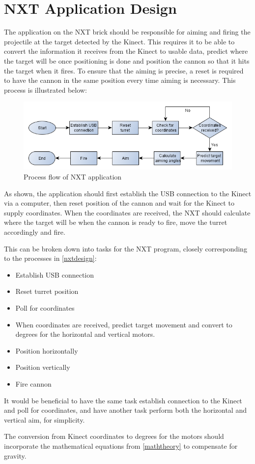 \section{NXT Application Design}

\label{nxtdesign}

The application on the NXT brick should be responsible for aiming and firing the projectile at the target detected by the Kinect. This requires it to be able to convert the information it receives from the Kinect to usable data, predict where the target will be once positioning is done and position the cannon so that it hits the target when it fires. To ensure that the aiming is precise, a reset is required to have the cannon in the same position every time aiming is necessary. This process is illustrated below:

\begin{figure}[hbtp]
	\includegraphics[scale=0.5]{img/nxtdesign.png}
	\caption{Process flow of NXT application}
	\label{nxtdesign}
\end{figure}

As shown, the application should first establish the USB connection to the Kinect via a computer, then reset position of the cannon and wait for the Kinect to supply coordinates. When the coordinates are received, the NXT should calculate where the target will be when the cannon is ready to fire, move the turret accordingly and fire.

This can be broken down into tasks for the NXT program, closely corresponding to the processes in \autoref{nxtdesign}:
\begin{itemize}
	\item Establish USB connection
	\item Reset turret position
	\item Poll for coordinates
	\item When coordinates are received, predict target movement and convert to degrees for the horizontal and vertical motors.
	\item Position horizontally
	\item Position vertically
	\item Fire cannon
\end{itemize}

It would be beneficial to have the same task establish connection to the Kinect and poll for coordinates, and have another task perform both the horizontal and vertical aim, for simplicity.

The conversion from Kinect coordinates to degrees for the motors should incorporate the mathematical equations from \autoref{maththeory} to compensate for gravity.